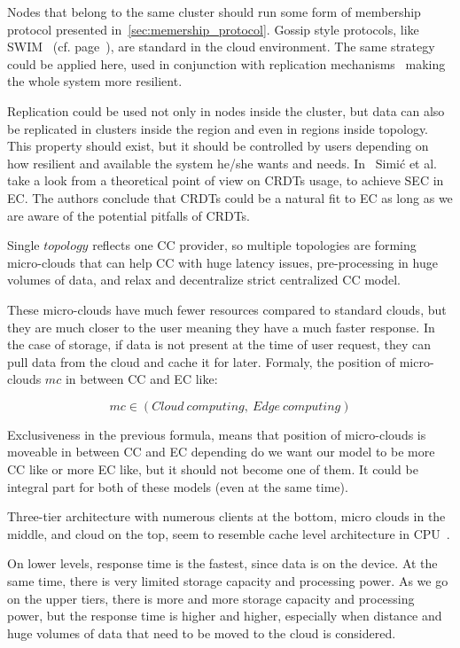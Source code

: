 Nodes that belong to the same cluster should run some form of membership protocol presented in~\ref{sec:memership_protocol}. Gossip style protocols, like SWIM~\cite{DasGM02} (cf. page~\pageref{swim}), are standard in the cloud environment. The same strategy could be applied here, used in conjunction with replication mechanisms~\cite{LiBCL20, CauCBFCEB16, CRDTS_Nuno} making the whole system more resilient. 

Replication could be used not only in nodes inside the cluster, but data can also be replicated in clusters inside the region and even in regions inside topology. This property should exist, but it should be controlled by users depending on how resilient and available the system he/she wants and needs. In~\cite{inproceedingsSimic2} Simi\' c et al. take a look from a theoretical point of view on CRDTs usage, to achieve SEC in EC. The authors conclude that CRDTs could be a natural fit to EC as long as we are aware of the potential pitfalls of CRDTs.

Single $topology$ reflects one CC provider, so multiple topologies are forming micro-clouds that can help CC with huge latency issues, pre-processing in huge volumes of data, and relax and decentralize strict centralized CC model.

These micro-clouds have much fewer resources compared to standard clouds, but they are much closer to the user meaning they have a much faster response. In the case of storage, if data is not present at the time of user request, they can pull data from the cloud and cache it for later. Formaly, the position of micro-clouds $mc$ in between CC and EC like:

\begin{equation}
mc \in \left( Cloud\ computing,\ Edge\ computing \right)
\end{equation}

\noindent
Exclusiveness in the previous formula, means that position of micro-clouds is moveable in between CC and EC depending do we want our model to be more CC like or more EC like, but it should not become one of them. It could be integral part for both of these models (even at the same time).

Three-tier architecture with numerous clients at the bottom, micro clouds in the middle, and cloud on the top, seem to resemble cache level architecture in CPU~\cite{FarshinRMK19}. 

On lower levels, response time is the fastest, since data is on the device. At the same time, there is very limited storage capacity and processing power. As we go on the upper tiers, there is more and more storage capacity and processing power, but the response time is higher and higher, especially when distance and huge volumes of data that need to be moved to the cloud is considered.

